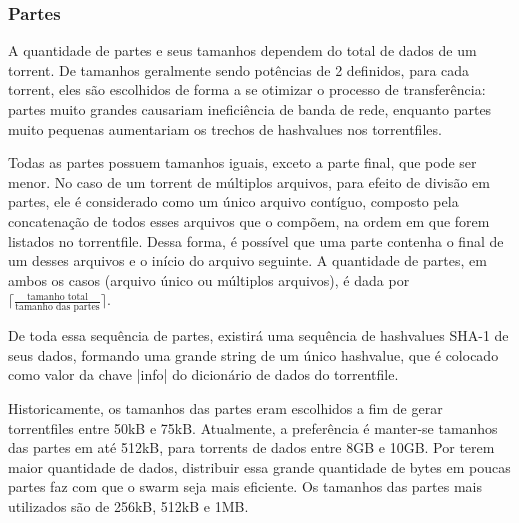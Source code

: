 \subsubsection*{Partes}
\label{subsec:partes}

A quantidade de partes e seus tamanhos dependem do total de dados de um \gls*{torrent}.
De tamanhos geralmente sendo potências de 2 definidos, para cada \gls*{torrent}, eles
são escolhidos de forma a se otimizar o processo de transferência: partes muito grandes
causariam ineficiência de banda de rede, enquanto partes muito pequenas aumentariam os
trechos de \glspl*{hashvalue} nos \glspl*{torrentfile}.

Todas as partes possuem tamanhos iguais, exceto a parte final, que pode ser menor. No
caso de um \gls*{torrent} de múltiplos arquivos, para efeito de divisão em partes, ele é
considerado como um único arquivo contíguo, composto pela concatenação de todos esses
arquivos que o compõem, na ordem em que forem listados no \gls*{torrentfile}. Dessa
forma, é possível que uma parte contenha o final de um desses arquivos e o início do
arquivo seguinte. A quantidade de partes, em ambos os casos (arquivo único ou
múltiplos arquivos), é dada por
$\lceil \frac{\textrm{tamanho total}}{\textrm{tamanho das partes}} \rceil$.

De toda essa sequência de partes, existirá uma sequência de \glspl*{hashvalue} SHA-1 de
seus dados, formando uma grande \gls*{string} de um único \gls*{hashvalue}, que é
colocado como valor da chave \bverb|info| do dicionário de dados do \gls*{torrentfile}.

Historicamente, os tamanhos das partes eram escolhidos a fim de gerar
\glspl*{torrentfile} entre 50kB e 75kB. Atualmente, a preferência é manter-se tamanhos
das partes em até 512kB, para \glspl*{torrent} de dados entre 8GB e 10GB. Por terem
maior quantidade de dados, distribuir essa grande quantidade de bytes em poucas partes
faz com que o \gls*{swarm} seja mais eficiente. Os tamanhos das partes mais utilizados
são de 256kB, 512kB e 1MB.